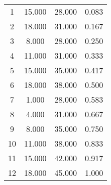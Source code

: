 % 
\begin{tabular}{cccc}
  \hline
  \hline
1 & 15.000 & 28.000 & 0.083 \\ 
  2 & 18.000 & 31.000 & 0.167 \\ 
  3 & 8.000 & 28.000 & 0.250 \\ 
  4 & 11.000 & 31.000 & 0.333 \\ 
  5 & 15.000 & 35.000 & 0.417 \\ 
  6 & 18.000 & 38.000 & 0.500 \\ 
  7 & 1.000 & 28.000 & 0.583 \\ 
  8 & 4.000 & 31.000 & 0.667 \\ 
  9 & 8.000 & 35.000 & 0.750 \\ 
  10 & 11.000 & 38.000 & 0.833 \\ 
  11 & 15.000 & 42.000 & 0.917 \\ 
  12 & 18.000 & 45.000 & 1.000 \\ 
   \hline
\end{tabular}
